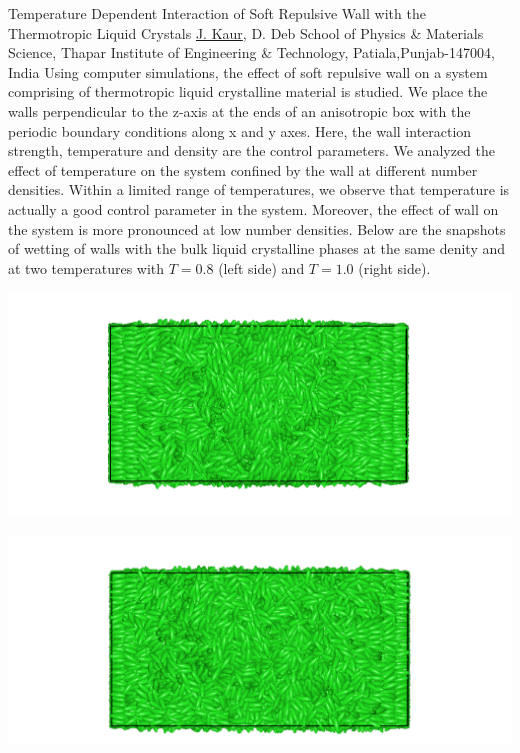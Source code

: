 
    \begin{abstract_online}{Temperature Dependent Interaction of Soft Repulsive Wall with the Thermotropic Liquid Crystals }{%
        \underline{J. Kaur}, D. Deb}{%
        }{%
        School of Physics & Materials Science, Thapar Institute of Engineering & Technology, Patiala,Punjab-147004, India}
    Using computer simulations, the effect of soft repulsive wall on a system comprising of thermotropic liquid crystalline material is studied. We place the walls perpendicular to the z-axis at the ends of an anisotropic box with the periodic boundary conditions along x and y axes. Here, the wall interaction strength, temperature and density are the control parameters. We analyzed the effect of temperature on the system confined by the wall at different number densities. Within a limited range of temperatures, we observe that temperature is actually a good control parameter in the system. Moreover, the effect of wall on the system is more pronounced at low number densities. Below are the snapshots of wetting of walls with the bulk liquid crystalline phases at the same denity and at two temperatures with $T=0.8$ (left side) and $T=1.0$ (right side). \begin{center}  \includegraphics[width=\linewidth]{abstracts/txt/figures/jagroop1.png}  \caption{\textbf{Figure 1:} At $T=0.8$ and $\rho=0.3137$, the bulk (center of the box) phase is the isotropic liquid but the order of the particles away from bulk and close the walls are changed and observed to form layers parallel to the walls.}  \end{center}  \begin{center}  \includegraphics[width=\linewidth]{abstracts/txt/figures/jagroop2.png}  \caption{\textbf{Figure 2:} At $T=1.0$ and $\rho=0.3137$, the bulk (center of the box) phase is the isotropic liquid but the order of the particles away from bulk and close the walls are changed and observed to form layers parallel to the walls. Here the number of layers formed near the wall is less than that of $T=0.8$.}  \end{center}  
    

\end{abstract_online}
